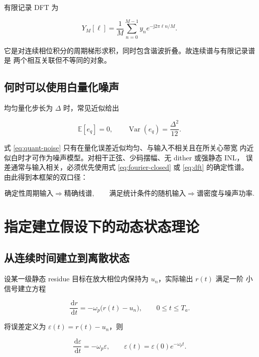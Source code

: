 \documentclass[11pt,a4paper]{ctexart}
\newcommand{\E}{\mathbb{E}}
\newcommand{\Var}{\operatorname{Var}}
\newcommand{\dd}{\,\mathrm{d}}
\newcommand{\jj}{\mathrm{j}}
\theoremstyle{adcplain}
\theoremstyle{definition}
\begin{document}
有限记录 DFT 为

\begin{equation}
  Y_M[\ell]
  =
  \frac{1}{M}
  \sum_{n=0}^{M-1}
  y_n e^{-\jj2\pi \ell n/M}.
  \label{eq:dft}
\end{equation}

它是对连续相位积分的周期梯形求积，同时包含谐波折叠。故连续谱与有限记录谱是
两个相互关联但不等同的对象。

\subsection{何时可以使用白量化噪声}

均匀量化步长为 $\Delta$ 时，常见近似给出

\begin{equation}
  \E[e_q]=0,
  \qquad
  \Var(e_q)=\frac{\Delta^2}{12}.
  \label{eq:quant-noise}
\end{equation}

式 \eqref{eq:quant-noise} 只有在量化误差近似均匀、与输入不相关且在所关心带宽
内近似白时才可作为噪声模型。对相干正弦、少码摆幅、无 dither 或强静态 INL，
误差通常与输入相关，必须优先使用式 \eqref{eq:fourier-closed} 或
\eqref{eq:dft} 的确定性谱。由此得到本框架的双口径：

\begin{equation}
  \text{确定性周期输入}
  \Longrightarrow
  \text{精确线谱},
  \qquad
  \text{满足统计条件的随机输入}
  \Longrightarrow
  \text{谱密度与噪声功率}.
\end{equation}

\section{指定建立假设下的动态状态理论}

\subsection{从连续时间建立到离散状态}

设某一级静态 residue 目标在放大相位内保持为 $u_n$，实际输出 $r(t)$ 满足一阶
小信号建立方程

\begin{equation}
  \frac{\dd r}{\dd t}
  =
  -\omega_p\bigl(r(t)-u_n\bigr),
  \qquad 0\le t\le T_a.
  \label{eq:continuous-settling}
\end{equation}

将误差定义为 $\varepsilon(t)=r(t)-u_n$，则

\begin{equation}
  \frac{\dd\varepsilon}{\dd t}=-\omega_p\varepsilon,
  \qquad
  \varepsilon(t)=\varepsilon(0)e^{-\omega_p t}.
\end{equation}
\end{document}
